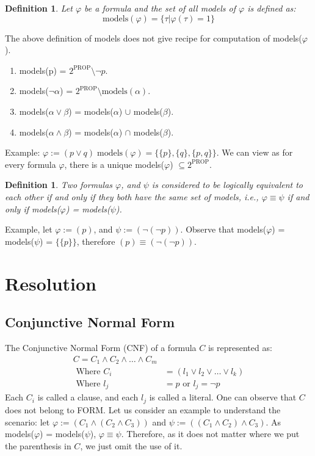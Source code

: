 \documentclass{article}
\newtheorem{definition}[theorem]{Definition}
\begin{document}
\begin{definition}
	Let $\varphi$ be a formula and the set of all models of $\varphi$ is defined as:
	$$\text{models}(\varphi) = \{\tau | \varphi(\tau) = 1 \}$$

\end{definition}

The above definition of models does not give recipe for computation of models($\varphi$).
\begin{enumerate}
	\item models(p) = $2^{\text{PROP}} \setminus {\lnot p}$.
	\item models($\lnot \alpha$) = $2^{\text{PROP}} \setminus \text{models}(\alpha)$.
	\item models($\alpha \lor \beta$) = models($\alpha$) $\cup$ models($\beta$).
	\item models($\alpha \land \beta$) = models($\alpha$) $\cap$ models($\beta$).
\end{enumerate}
Example: $\varphi := (p \lor q) \; \text{models}(\varphi) = \{ \{p\},  \{q\}, \{p,q\} \}$.
We can view as for every formula $\varphi$, there is a unique models($\varphi$) $\subseteq 2^{\text{PROP}}$.
\begin{definition}
	Two formulas $\varphi$, and $\psi$ is considered to be logically equivalent to each other if and only if they both have the same set of models, i.e., $\varphi \equiv \psi$ if and only if models($\varphi$) = models($\psi$).
\end{definition}
Example, let $\varphi := (p)$, and $\psi := (\lnot(\lnot p))$. Observe that models($\varphi$) = models($\psi$) = $\{\{p\}\}$, therefore $(p) \equiv (\lnot (\lnot p))$.


\section{Resolution}

\subsection{Conjunctive Normal Form}

The Conjunctive Normal Form (CNF) of a formula $C$ is represented as:
\begin{align*}
	C = C_1 \land C_2 \land \ldots \land C_{m} \\
	\text{ Where } C_{i} &= ( l_1 \lor l_2 \lor \ldots \lor l_k)\\
	\text{ Where } l_{j} &= p \text{ or } l_{j} = \lnot p
\end{align*}
Each $C_i$ is called a clause, and each $l_j$ is called a literal. One can observe that $C$ does not belong to FORM. Let us consider an example to understand the scenario:
let $\varphi := (C_1 \land (C_2 \land C_3))$ and $\psi := ((C_1 \land C_2) \land C_3)$. As models($\varphi$) = models($\psi$), $\varphi \equiv \psi$. Therefore, as it does not matter where we put the parenthesis in $C$, we just omit the use of it.
\end{document}

